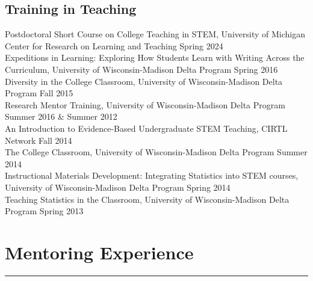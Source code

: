 \documentclass[
  10pt,
]
{article}
\begin{document}
\subsection{Training in Teaching}\label{training-in-teaching}

\normalsize Postdoctoral Short Course on College Teaching in STEM,
University of Michigan Center for Research on Learning and Teaching
\hfill Spring 2024\\
\normalsize Expeditions in Learning: Exploring How Students Learn with
Writing Across the Curriculum, University of Wisconsin-Madison Delta
Program \hfill Spring 2016\\
\normalsize Diversity in the College Classroom, University of
Wisconsin-Madison Delta Program \hfill Fall 2015\\
\normalsize Research Mentor Training, University of Wisconsin-Madison
Delta Program \hfill Summer 2016 \& Summer 2012\\
\normalsize An Introduction to Evidence-Based Undergraduate STEM
Teaching, CIRTL Network \hfill Fall 2014\\
\normalsize The College Classroom, University of Wisconsin-Madison Delta
Program \hfill Summer 2014\\
\normalsize Instructional Materials Development: Integrating Statistics
into STEM courses, University of Wisconsin-Madison Delta Program
\hfill Spring 2014\\
\normalsize Teaching Statistics in the Classroom, University of
Wisconsin-Madison Delta Program \hfill Spring 2013

\section{Mentoring Experience}\label{mentoring-experience}

\hrule
\end{document}
